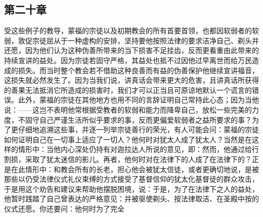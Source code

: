 
\subsection{第二十章}

\par

受这些例子的教导，蒙福的宗徒以及初期教会的所有首要首领，也都因软弱者的软弱，敦促宗徒屈从于一种虚构的安排，坚持要他按照法律的要求洁净自己、剃头并还愿，因为他们认为这种伪善所带来的当下损害不足挂齿，反而更看重由此带来的持续宣讲的益处。因为宗徒若固守严格，其益处也抵不过因他过早离世而给万民造成的损失。而当时整个教会若不借助这种良善而有益的伪善保护他继续宣讲福音，这损失就必然发生了。因为当我们说，讲真话会带来更大的危害，且讲真话所获得的善果无法抵消它所造成的损害时，我们才可以正当且可原谅地默认一个谎言的错误。\newline{}\newline{}此外，蒙福的宗徒在其他地方也用不同的言辞证明自己常持此心态；因为当他说：——这岂不表明他常根据受教者的软弱和能力而降卑自己，放松一些完美的力度，不固守自己严谨生活所似乎要求的事，反而更偏爱软弱者之益所要求的事？\newline{}\newline{}为了更仔细地追溯这些事，并逐一列举宗徒善行的荣光，有人可能会问：蒙福的宗徒如何证明自己在一切事上适应了一切人？他何时对犹太人成了犹太人？当然是在这样的情形中：当他内心深处仍持有对迦拉达人所说的意见，即：然而，他通过给行割损，采取了犹太迷信的影儿。\newline{}\newline{}再者，他何时对在法律下的人成了在法律下的？正是在此情形中：和教会所有的长老，担心他会被犹太信徒，或者更确切地说，是被那些以仍受法律仪式礼仪束缚的方式接受了基督信仰的犹太化基督徒的群众攻击，于是用这个劝告和建议来帮助他摆脱困境，说：于是，为了在法律下之人的益处，他暂时践踏了自己曾表达的严格意见：并被驱使剃头、按法律取洁、在圣殿中按的仪式还愿。\newline{}\newline{}你还要问：他何时为了完全